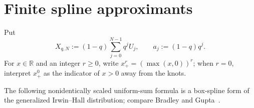 \documentclass[11pt,oneside,openany]{book}
\theoremstyle{definition}
\theoremstyle{remark}
\newcommand{\R}{\mathbb R}
\begin{document}
\section{Finite spline approximants}

Put
\begin{equation}\label{eq:finite-geometric-uniform-sum}
 X_{q,N}:=(1-q)\sum_{j=0}^{N-1}q^jU_j,
 \qquad
 a_j:=(1-q)q^j.
\end{equation}
For $x\in\R$ and an integer $r\ge0$, write
$x_+^r=(\max(x,0))^r$; when $r=0$, interpret $x_+^0$ as the indicator of $x>0$ away from the knots.

The following nonidentically scaled uniform-sum formula is a box-spline form of the generalized Irwin--Hall distribution; compare Bradley and Gupta~\cite{BradleyGupta2004}.

\end{document}
